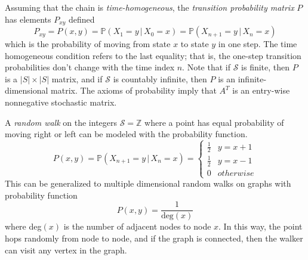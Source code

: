   \begin{definition}
    \label{def:transition-matrix}
    Assuming that the chain is \textit{time-homogeneous}, the \textit{transition probability matrix} $P$ has elements $P_{x y}$ defined
    \begin{equation}
      P_{x y} = P(x, y) = \mathbb{P}(X_1 = y \,|\, X_0 = x) = \mathbb{P}(X_{n+1} = y \,|\, X_n = x)
    \end{equation}
    which is the probability of moving from state $x$ to state $y$ in one step. The time homogeneous condition refers to the last equality; that is, the one-step transition probabilities don't change with the time index $n$. Note that if $\mathcal{S}$ is finite, then $P$ is a $|S| \times |S|$ matrix, and if $\mathcal{S}$ is countably infinite, then $P$ is an infinite-dimensional matrix. The axioms of probability imply that $A^T$ is an entry-wise nonnegative stochastic matrix.
  \end{definition}

  \begin{example}
    \label{ex:random-walks}
    A \textit{random walk} on the integers $\mathcal{S} = \mathbb{Z}$ where a point has equal probability of moving right or left can be modeled with the probability function. 
    \begin{equation}
      P(x, y) = \mathbb{P}(X_{n+1} = y \, | \, X_n = x) = \begin{cases}
      \frac{1}{2} & y = x + 1 \\
      \frac{1}{2} & y = x - 1\\
      0 & otherwise
      \end{cases}
    \end{equation}
    This can be generalized to multiple dimensional random walks on graphs with probability function 
    \begin{equation}
      P(x, y) = \frac{1}{\text{deg}(x)}
    \end{equation}
    where deg$(x)$ is the number of adjacent nodes to node $x$. In this way, the point hops randomly from node to node, and if the graph is connected, then the walker can visit any vertex in the graph. 
  \end{example}

